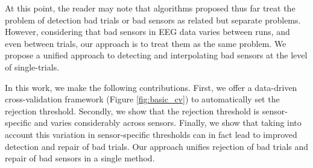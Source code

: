 At this point, the reader may note that algorithms proposed thus far treat the problem of detection bad trials or bad sensors as related but separate problems. However, considering that bad sensors in EEG data varies between runs, and even between trials, our approach is to treat them as the same problem. We propose a unified approach to detecting and interpolating bad sensors at the level of single-trials.


In this work, we make the following contributions. First, we offer a data-driven cross-validation framework (Figure \ref{fig:basic_cv}) to automatically set the rejection threshold. Secondly, we show that the rejection threshold is sensor-specific and varies considerably across sensors. Finally, we show that taking into account this variation in sensor-specific thresholds can in fact lead to improved detection and repair of bad trials. Our approach unifies rejection of bad trials and repair of bad sensors in a single method.
